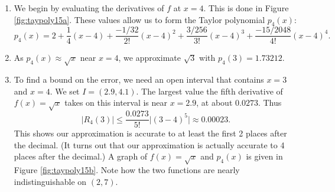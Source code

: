 {\begin{enumerate}
\item		We begin by evaluating the derivatives of $f$ at $x=4$. This is done in Figure \ref{fig:taypoly15a}.
These values allow us to form the Taylor polynomial $p_4(x)$:
$$p_4(x) = 2 + \frac14(x-4) +\frac{-1/32}{2!}(x-4)^2+\frac{3/256}{3!}(x-4)^3+\frac{-15/2048}{4!}(x-4)^4.$$

\item		As $p_4(x) \approx \sqrt{x}$ near $x=4$, we approximate $\sqrt{3}$ with $p_4(3) = 1.73212$.

\item		To find a bound on the error, we need an open interval that contains $x=3$ and $x=4$. We set $I = (2.9,4.1)$. The largest value the fifth derivative of $f(x)=\sqrt{x}$ takes on this interval is near $x=2.9$, at about $0.0273$. Thus 
$$\big|R_4(3)\big| \leq \frac{0.0273}{5!}\big|(3-4)^5\big| \approx 0.00023.$$
This shows our approximation is accurate to at least the first 2 places after the decimal. (It turns out that our approximation is actually accurate to 4 places after the decimal.) A graph of $f(x)=\sqrt x$ and $p_4(x)$ is given in Figure \ref{fig:taypoly15b}. Note how the two functions are nearly indistinguishable on $(2,7)$.
\end{enumerate}
\baselineskip
}\\

